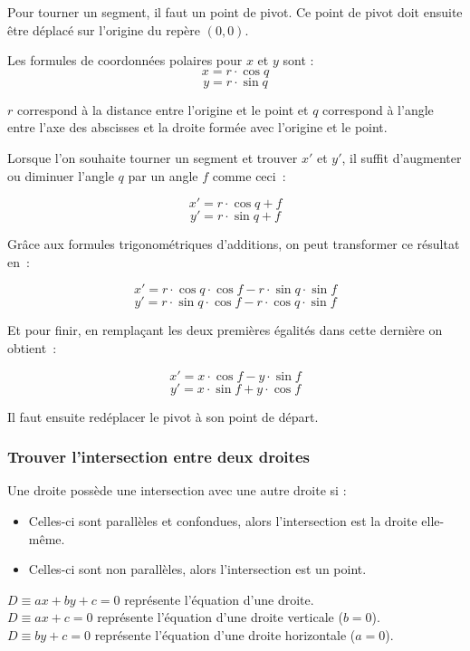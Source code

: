 \documentclass[]{report}
\begin{document}
Pour tourner un segment, il faut un point de pivot. Ce point de pivot
doit ensuite être déplacé sur l'origine du repère $ (0, 0) $.

Les formules de coordonnées polaires pour $ x $ et $ y $ sont :
$$ x = r \cdot \cos{q} $$ 
$$ y = r \cdot \sin{q} $$

$ r $ correspond à la distance entre l'origine et le point et $ q $ correspond 
à l'angle entre l'axe des abscisses et la droite formée avec l'origine et le point.

Lorsque l'on souhaite tourner un segment et trouver $ x' $ et $ y' $, 
il suffit d'augmenter ou diminuer l'angle $ q $ par un angle $ f $ comme ceci~:

$$ x' = r \cdot \cos{q + f} $$
$$ y' = r \cdot \sin{q + f} $$

Grâce aux formules trigonométriques d'additions, on peut transformer ce résultat en~:

$$ x' = r \cdot \cos{q} \cdot \cos{f} - r \cdot \sin{q} \cdot \sin{f} $$
$$ y' = r \cdot \sin{q} \cdot \cos{f} - r \cdot \cos{q} \cdot \sin{f} $$

Et pour finir, en remplaçant les deux premières égalités dans cette dernière on obtient~: 

$$ x' = x \cdot \cos{f} - y \cdot \sin{f} $$
$$ y' = x \cdot \sin{f} + y \cdot \cos{f} $$

Il faut ensuite redéplacer le pivot à son point de départ.

\newpage
\subsubsection{\label{AnnexeIntersects}Trouver l'intersection entre deux droites}

Une droite possède une intersection avec une autre droite si :
\begin{itemize}
    \item Celles-ci sont parallèles et confondues, alors l'intersection est la droite elle-même.
    \item Celles-ci sont non parallèles, alors l'intersection est un point. \\
\end{itemize} 

$ D \equiv ax + by + c = 0 $ représente l'équation d'une droite. \\
$ D \equiv ax + c = 0 $ représente l'équation d'une droite verticale ($b = 0$). \\
$ D \equiv by + c = 0 $ représente l'équation d'une droite horizontale ($a = 0$). \\
\end{document}

